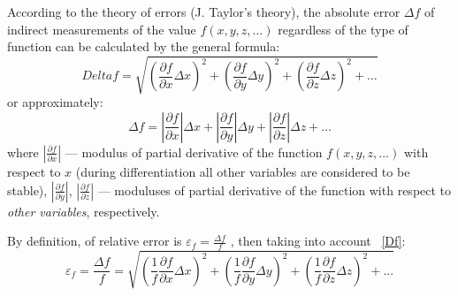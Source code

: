 \documentclass{LabWorkEng}
\begin{document}
\noindent%
\begin{More}
	According to the theory of errors (J. Taylor's theory), the absolute error $\Delta f$ of indirect measurements of the value $f (x, y, z, \ldots)$ regardless of the type of function can be calculated by the general formula:
	\begin{equation}\label{Df}
		Delta f = \sqrt {{{\left( {\frac{{\partial f}}{{\partial x}}\Delta x} \right)}^2} + {{\left( {\frac{{\partial f}}{{\partial y}}\Delta y} \right)}^2} + {{\left( {\frac{{\partial f}}{{\partial z}}\Delta z} \right)}^2} + \ldots}
	\end{equation}
	or approximately:
	\begin{equation}
		\Delta f = \left| {\frac{{\partial f}}{{\partial x}}} \right|\Delta x + \left| {\frac{{\partial f}}{{\partial y}}} \right|\Delta y + \left| {\frac{{\partial f}}{{\partial z}}} \right|\Delta z + \ldots
	\end{equation}
	where $\left| \frac{\partial f}{\partial x} \right|$ ---	modulus of partial derivative of the function $f (x, y, z, \ldots)$  with respect to $x$ (during differentiation all other variables are considered to be stable),  $\left| \frac{\partial f}{\partial y} \right|$,  $\left| \frac{\partial f}{\partial z} \right|$  --- moduluses of partial derivative of the function with respect to \textit{other variables}, respectively.

	By definition, of relative error is  $\varepsilon _f = \frac{\Delta f}{f}$	, then taking into account ~\eqref{Df}:
	\begin{equation}
		\varepsilon _f = \frac{{\Delta f}}{f} = \sqrt {{{\left( {\frac{1}{f}\frac{{\partial f}}{{\partial x}}\Delta x} \right)}^2} + {{\left( {\frac{1}{f}\frac{{\partial f}}{{\partial y}}\Delta y} \right)}^2} + {{\left( {\frac{1}{f}\frac{{\partial f}}{{\partial z}}\Delta z} \right)}^2} + ...}
	\end{equation}
\end{More}
\end{document}
